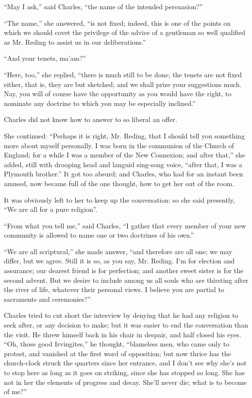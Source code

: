 ``May I ask,'' said Charles, ``the name of the intended
persuasion?''

``The name,'' she answered, ``is not fixed; indeed,
this is one of the points on which we should covet the privilege of
the advice of a gentleman so well qualified as Mr. Reding to assist us
in our deliberations.''

``And your tenets, ma'am?''

``Here, too,'' she replied, ``there is much still to be
done; the tenets are not fixed either, that is, they are but sketched;
and we shall prize your suggestions much. Nay, you will of course have
the opportunity as you would have the right, to nominate any doctrine
to which you may be especially inclined.''

Charles did not know how to answer to so liberal an offer.

She continued: ``Perhaps it is right, Mr. Reding, that I should
tell you something more about myself personally. I was born in the
communion of the Church of England; for a while I was a member
of the New Connexion; and after that,'' she added, still with
drooping head and languid sing-song voice, ``after that, I was a
Plymouth brother.'' It got too absurd; and Charles, who had for an
instant been amused, now became full of the one thought, how to get
her out of the room.

It was obviously left to her to keep up the conversation: so she
said presently, ``We are all for a pure religion''.

``From what you tell me,'' said Charles, ``I gather
that every member of your new community is allowed to name one or two
doctrines of his own.''

``We are all scriptural,'' she made answer, ``and
therefore are all one; we may differ, but we agree. Still it is so, as
you say, Mr. Reding. I'm for election and assurance; our dearest
friend is for perfection; and another sweet sister is for the second
advent. But we desire to include among us all souls who are thirsting
after the river of life, whatever their personal views. I believe you
are partial to sacraments and ceremonies?''

Charles tried to cut short the interview by denying that he had any
religion to seek after, or any decision to make; but it was easier to
end the conversation than the visit. He threw himself back in his
chair in despair, and half closed his eyes. ``Oh, those good
Irvingites,'' he thought, ``blameless men, who came only to
protest, and vanished at the first word of opposition; but now thrice
has the church-clock struck the quarters since her entrance, and I don't
see why she's not to stop here as long as it goes on striking,
since she has stopped so long. She has not in her the elements of
progress and decay. She'll never die; what is to become of me?''

